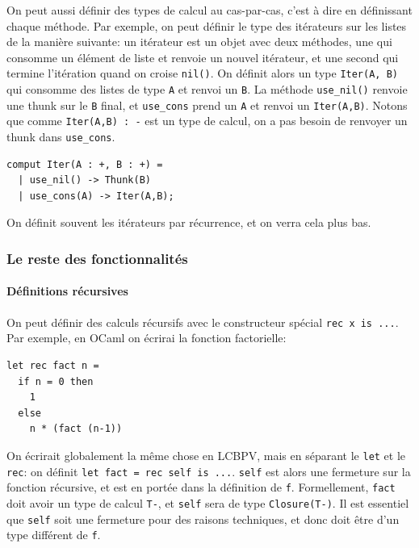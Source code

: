\documentclass[12pt]{article}
\begin{document}
On peut aussi définir des types de calcul au cas-par-cas, c'est à dire
en définissant chaque méthode. Par exemple, on peut définir le type des
itérateurs sur les listes de la manière suivante: un itérateur est un
objet avec deux méthodes, une qui consomme un élément de liste et renvoie
un nouvel itérateur, et une second qui termine l'itération quand on
croise \texttt{nil()}. On définit alors un type \texttt{Iter(A,\ B)} qui
consomme des listes de type \texttt{A} et renvoi un \texttt{B}. La
méthode \texttt{use\_nil()} renvoie une thunk sur le \texttt{B} final,
et \texttt{use\_cons} prend un \texttt{A} et renvoi un
\texttt{Iter(A,B)}. Notons que comme \texttt{Iter(A,B)\ :\ -} est un
type de calcul, on a pas besoin de renvoyer un thunk dans
\texttt{use\_cons}.

\begin{verbatim}
comput Iter(A : +, B : +) =
  | use_nil() -> Thunk(B)
  | use_cons(A) -> Iter(A,B);
\end{verbatim}

On définit souvent les itérateurs par récurrence, et on verra cela plus
bas.

\hypertarget{le-reste-des-fonctionalituxe9s}{%
      \subsubsection*{Le reste des
            fonctionnalités}\label{le-reste-des-fonctionnalités 9s}}

\hypertarget{duxe9finitions-ruxe9cursives}{%
      \paragraph*{Définitions
            récursives}\label{duxe9finitions-ruxe9cursives}}

On peut définir des calculs récursifs avec le constructeur spécial
\texttt{rec\ x\ is\ ...}. Par exemple, en OCaml on écrirai la fonction
factorielle:

\begin{verbatim}
let rec fact n = 
  if n = 0 then
    1 
  else 
    n * (fact (n-1))
\end{verbatim}

On écrirait globalement la même chose en LCBPV, mais en séparant le
\texttt{let} et le \texttt{rec}: on définit
\texttt{let\ fact\ =\ rec\ self\ is\ ...}. \texttt{self} est alors une
fermeture sur la fonction récursive, et est en portée dans la définition
de \texttt{f}. Formellement, \texttt{fact} doit avoir un type de calcul
\texttt{T-}, et \texttt{self} sera de type \texttt{Closure(T-)}. Il est
essentiel que \texttt{self} soit une fermeture pour des raisons
techniques, et donc doit être d'un type différent de \texttt{f}.
\end{document}
